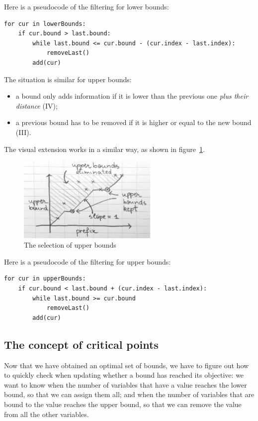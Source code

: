 \documentclass[a4paper,10pt]{article}
\begin{document}
Here is a pseudocode of the filtering for lower bounds:
\begin{lstlisting}
for cur in lowerBounds:
    if cur.bound > last.bound:
        while last.bound <= cur.bound - (cur.index - last.index):
            removeLast()
        add(cur)
\end{lstlisting}

The situation is similar for upper bounds:
\begin{itemize}
    \item a bound only adds information if it is lower than the previous one \emph{plus their distance} (IV);
    \item a previous bound has to be removed if it is higher or equal to the new bound (III).
\end{itemize}

The visual extension works in a similar way, as shown in figure~\ref{fig:upper-bounds}.

\begin{figure}[h!]
    \centering
    \includegraphics[width=0.6\textwidth]{upper-bounds}
    \caption{The selection of upper bounds}
    \label{fig:upper-bounds}
\end{figure}

Here is a pseudocode of the filtering for upper bounds:
\begin{lstlisting}
for cur in upperBounds:
    if cur.bound < last.bound + (cur.index - last.index):
        while last.bound >= cur.bound
            removeLast()
        add(cur)
\end{lstlisting}

\subsection{The concept of critical points}
\label{subsec:critical}

Now that we have obtained an optimal set of bounds, we have to figure out how to quickly check when updating whether a bound has reached its objective: we want to know when the number of variables that have a value reaches the lower bound, so that we can assign them all; and when the number of variables that are bound to the value reaches the upper bound, so that we can remove the value from all the other variables.
\end{document}

